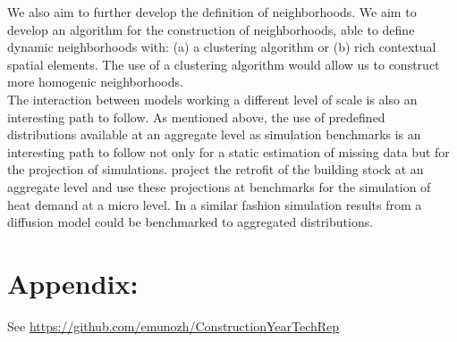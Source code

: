We also aim to further develop the definition of neighborhoods. We aim to
develop an algorithm for the construction of neighborhoods, able to define
dynamic neighborhoods with: (a) a clustering algorithm or (b) rich contextual
spatial elements. The use of a clustering algorithm would allow us to construct
more homogenic neighborhoods.\\

The interaction between models working a different level of scale is also an
interesting path to follow. As mentioned above, the use of predefined
distributions available at an aggregate level as simulation benchmarks is an
interesting path to follow not only for a static estimation of missing data but
for the projection of simulations.  project the
retrofit of the building stock at an aggregate level and use these projections
at benchmarks for the simulation of heat demand at a micro level. In a similar
fashion simulation results from a diffusion model could be benchmarked to
aggregated distributions.\\

\section{Appendix:}
 
See \url{https://github.com/emunozh/ConstructionYearTechRep}

